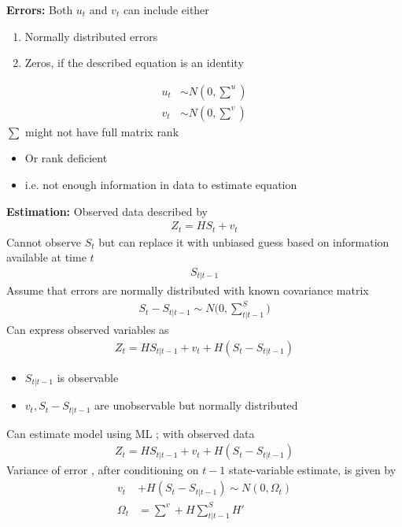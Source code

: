 \documentclass{beamer}
\begin{document}
\begin{frame}
  \textbf{Errors:} Both $u_t$ and $v_t$ can include either 
  \begin{enumerate}
    \item Normally distributed errors
    \item Zeros, if the described equation is an identity
  \end{enumerate}
  \begin{align}
    u_t &\sim N(0,\scriptstyle \sum^u) \\
    v_t &\sim N(0,\scriptstyle \sum^v)
  \end{align}
  \medskip
  $\sum$ might not have full matrix rank
  \begin{itemize}
    \item Or rank deficient
    \item i.e. not enough information in data to estimate equation
  \end{itemize}  
\end{frame}

\begin{frame}
  \textbf{Estimation:} Observed data described by
  \begin{align}
    Z_t = HS_t + v_t
  \end{align}
  Cannot observe $S_t$ but can replace it with unbiased guess based on information available at time $t$
  \begin{align}
    S_{t|t-1}
  \end{align}
  Assume that errors are normally distributed with known covariance matrix
  \begin{align}
    S_t-S_{t|t-1} \sim N (0,\scriptstyle \sum^S_{t|t-1} \textstyle)
  \end{align}
  Can express observed variables as
  \begin{align}
    Z_t=HS_{t|t-1}+v_t +H(S_t-S_{t|t-1})
  \end{align}
\end{frame}



\begin{frame}
  \begin{itemize}
     \item $S_{t|t-1}$ is observable
     \item $v_t, S_t-S_{t|t-1}$ are unobservable but normally distributed
   \end{itemize} 
  Can estimate model using ML ; with observed data
  \begin{align}
    Z_t=HS_{t|t-1}+v_t +H(S_t-S_{t|t-1})
  \end{align}
  Variance of error , after conditioning on $t-1$ state-variable estimate, is given by
  \begin{align}
    v_t &+ H(S_t-S_{t|t-1}) \sim N (0,\Omega_t)\\
    \Omega_t &=\scriptstyle\sum^v +H\sum^S_{t|t-1}H'
  \end{align}  
\end{frame}
\end{document}

